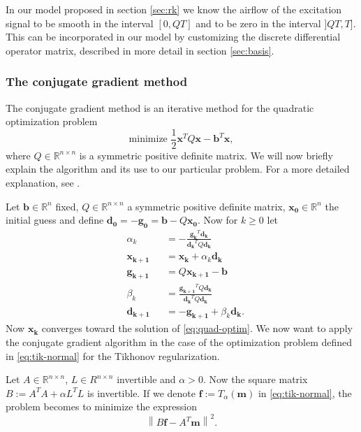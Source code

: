 \documentclass[12pt,a4]{article}
\newcommand{\R}{{\mathbb R}}
\newcommand{\lnorm}{\left\|}
\newcommand{\rnorm}{\right\|}
\newcommand{\vc}[1]{\ensuremath{\bm{#1}}}
\begin{document}
In our model proposed in section \ref{sec:rk} we know the airflow of the excitation signal to be smooth in the interval $[0, QT]$ and to be zero in the interval $]QT, T]$. This can be incorporated in our model by customizing the discrete differential operator matrix, described in more detail in section \ref{sec:basis}.


\subsubsection{The conjugate gradient method}
\label{sec:conjgrad}

The conjugate gradient method is an iterative method for the quadratic optimization problem
\begin{equation}
\label{eq:quad-optim}
\text{minimize } \frac{1}{2} \vc{x}^T Q \vc{x} - \vc{b}^T \vc{x} ,
\end{equation}
where $Q \in \R^{n \times n}$ is a symmetric positive definite matrix. We will now briefly explain the algorithm and its use to our particular problem. For a more detailed explanation, see \cite{samu}.

Let $\vc{b} \in \R^n$ fixed, $Q \in \R^{n \times n}$ a symmetric positive definite matrix, $\vc{x_0} \in \R^n$ the initial guess and define $\vc{d_0} = -\vc{g_0} = \vc{b} - Q \vc{x_0}$. Now for $k \geq 0$ let
\begin{equation}
\begin{alignedat}{3}
&\alpha_k      &&= -\frac{\vc{g_k}^T \vc{d_k}}{\vc{d_k}^T Q \vc{d_k}} \\
&\vc{x_{k+1}}  &&= \vc{x_k} + \alpha_k \vc{d_k} \\
&\vc{g_{k+1}}  &&= Q \vc{x_{k+1}} - \vc{b} \\
&\beta_k       &&= \frac{\vc{g_{k+1}}^T Q \vc{d_k}}{\vc{d_k}^T Q \vc{d_k}} \\
&\vc{d_{k+1}}  &&= -\vc{g_{k+1}} + \beta_k \vc{d_k} .
\end{alignedat}
\end{equation}
Now $\vc{x_k}$ converges toward the solution of \eqref{eq:quad-optim}. We now want to apply the conjugate gradient algorithm in the case of the optimization problem defined in \eqref{eq:tik-normal} for the Tikhonov regularization.

Let $A \in \R^{n \times n}$, $L \in R^{n \times n}$ invertible and $\alpha > 0$. Now the square matrix $B := A^T A + \alpha L^T L$ is invertible. If we denote $\vc{f} := T_\alpha ( \vc{m} )$ in \eqref{eq:tik-normal}, the problem becomes to minimize the expression
\begin{equation}
\label{eq:conjgrad-basis}
\lnorm B \vc{f} - A^T \vc{m} \rnorm^2 .
\end{equation}
\end{document}
